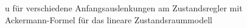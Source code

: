 \documentclass[
	pagesize,
	fontsize=12pt,
	paper=a4,
	oneside,
   reqno
]{scrartcl}
\begin{document}
\begin{figure}[H]
    \centering
    \caption[u für Regler mit Ackermann-Formel (linear)]{u für verschiedene Anfangsauslenkungen am Zustandsregler mit Ackermann-Formel für das lineare Zustandsraummodell}
    \label{fig:Bild14}
\end{figure}
\end{document}
